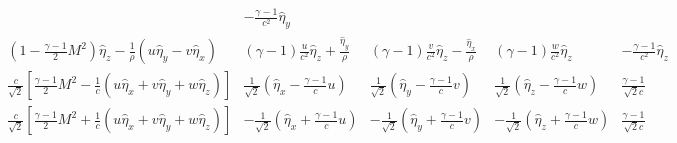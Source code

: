 \begin{align*}
\begin{array}{c|c|c|c|c}
&
-\frac{\gamma-1}{c^2}\hat{\eta}_y
\\ \hline
\left(1-\frac{\gamma -1}{2}M^2\right)\hat{\eta}_z-\frac{1}{\rho}\left(u\hat{\eta}_y-v\hat{\eta}_x\right)
&
\left(\gamma-1\right)\frac{u}{c^2}\hat{\eta}_z+\frac{\hat{\eta}_y}{\rho}
&
\left(\gamma-1\right)\frac{v}{c^2}\hat{\eta}_z-\frac{\hat{\eta}_x}{\rho}
&
\left(\gamma-1\right)\frac{w}{c^2}\hat{\eta}_z
&
-\frac{\gamma-1}{c^2}\hat{\eta}_z
\\ \hline
\frac{c}{\sqrt{2}}\left[\frac{\gamma-1}{2}M^2-\frac{1}{c}\left(u\hat{\eta}_x+v\hat{\eta}_y+w\hat{\eta}_z\right)\right]
&
\frac{1}{\sqrt{2}}\left(\hat{\eta}_x-\frac{\gamma-1}{c}u\right)
&
\frac{1}{\sqrt{2}}\left(\hat{\eta}_y-\frac{\gamma-1}{c}v\right)
&
\frac{1}{\sqrt{2}}\left(\hat{\eta}_z-\frac{\gamma-1}{c}w\right)
&
\frac{\gamma-1}{\sqrt{2} c}
\\ \hline
\frac{c}{\sqrt{2}}\left[\frac{\gamma-1}{2}M^2+\frac{1}{c}\left(u\hat{\eta}_x+v\hat{\eta}_y+w\hat{\eta}_z\right)\right]
&
-\frac{1}{\sqrt{2}}\left(\hat{\eta}_x+\frac{\gamma-1}{c}u\right)
&
-\frac{1}{\sqrt{2}}\left(\hat{\eta}_y+\frac{\gamma-1}{c}v\right)
&
-\frac{1}{\sqrt{2}}\left(\hat{\eta}_z+\frac{\gamma-1}{c}w\right)
&
\frac{\gamma-1}{\sqrt{2} c}
\end{array}
\end{align*}

